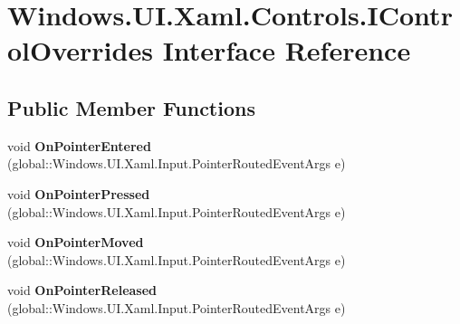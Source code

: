 \hypertarget{interface_windows_1_1_u_i_1_1_xaml_1_1_controls_1_1_i_control_overrides}{}\section{Windows.\+U\+I.\+Xaml.\+Controls.\+I\+Control\+Overrides Interface Reference}
\label{interface_windows_1_1_u_i_1_1_xaml_1_1_controls_1_1_i_control_overrides}
\subsection*{Public Member Functions}
\begin{DoxyCompactItemize}
\item 
\mbox{\label{interface_windows_1_1_u_i_1_1_xaml_1_1_controls_1_1_i_control_overrides_aebdacd3d3edf279d7d0351a9e07d38b9}} 
void {\bfseries On\+Pointer\+Entered} (global\+::\+Windows.\+U\+I.\+Xaml.\+Input.\+Pointer\+Routed\+Event\+Args e)
\item 
\mbox{\label{interface_windows_1_1_u_i_1_1_xaml_1_1_controls_1_1_i_control_overrides_a000f5ca6e169dbe7374282c4b49018ee}} 
void {\bfseries On\+Pointer\+Pressed} (global\+::\+Windows.\+U\+I.\+Xaml.\+Input.\+Pointer\+Routed\+Event\+Args e)
\item 
\mbox{\label{interface_windows_1_1_u_i_1_1_xaml_1_1_controls_1_1_i_control_overrides_a160432782526eceb8609f82df81b623c}} 
void {\bfseries On\+Pointer\+Moved} (global\+::\+Windows.\+U\+I.\+Xaml.\+Input.\+Pointer\+Routed\+Event\+Args e)
\item 
\mbox{\label{interface_windows_1_1_u_i_1_1_xaml_1_1_controls_1_1_i_control_overrides_ac9b5c4e172dfe3a9452219d0beb460b5}} 
void {\bfseries On\+Pointer\+Released} (global\+::\+Windows.\+U\+I.\+Xaml.\+Input.\+Pointer\+Routed\+Event\+Args e)
\item 
\mbox{\label{interface_windows_1_1_u_i_1_1_xaml_1_1_controls_1_1_i_control_overrides_aec342f687e1c436a3c9ea647acf70cf1}} 

\end{DoxyCompactItemize}

